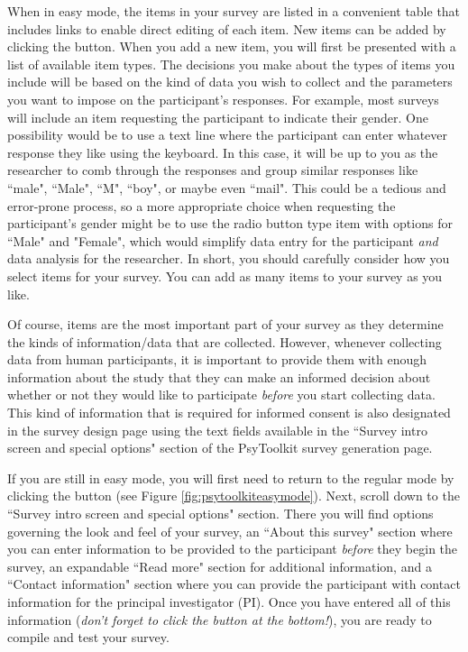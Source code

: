 When in easy mode, the items in your survey are listed in a convenient table that includes links to enable direct editing of each item.  New items can be added by clicking the \button{+} button.  When you add a new item, you will first be presented with a list of available item types.  The decisions you make about the types of items you include will be based on the kind of data you wish to collect and the parameters you want to impose on the participant's responses.  For example, most surveys will include an item requesting the participant to indicate their gender.  One possibility would be to use a text line where the participant can enter whatever response they like using the keyboard. In this case, it will be up to you as the researcher to comb through the responses and group similar responses like ``male", ``Male", ``M", ``boy", or maybe even ``mail".  This could be a tedious and error-prone process, so a more appropriate choice when requesting the participant's gender might be to use the radio button type item with options for ``Male" and "Female", which would simplify data entry for the participant \emph{and} data analysis for the researcher.  In short, you should carefully consider how you select items for your survey.  You can add as many items to your survey as you like.

Of course, items are the most important part of your survey as they determine the kinds of information/data that are collected.  However, whenever collecting data from human participants, it is important to provide them with enough information about the study that they can make an informed decision about whether or not they would like to participate \emph{before} you start collecting data.  This kind of information that is required for \gls{informed consent} is also designated in the survey design page using the text fields available in the ``Survey intro screen and special options" section of the PsyToolkit survey generation page.  

If you are still in easy mode, you will first need to return to the regular mode by clicking the  button (see Figure \ref{fig:psytoolkiteasymode}). Next, scroll down to the ``Survey intro screen and special options" section.  There you will find options governing the look and feel of your survey, an ``About this survey" section where you can enter information to be provided to the participant \emph{before} they begin the survey, an expandable ``Read more" section for additional information, and a ``Contact information" section where you can provide the participant with contact information for the \gls{principal investigator} (PI). Once you have entered all of this information (\emph{don't forget to click the  button at the bottom!}), you are ready to compile and test your survey.

